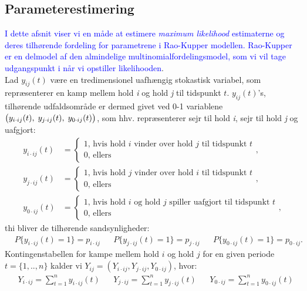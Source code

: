 \documentclass[11pt,a4paper]{article}
\begin{document}
\subsection{Parameterestimering}
\textcolor{blue}{I dette afsnit viser vi en måde at estimere \textit{maximum likelihood} estimaterne og deres tilhørende fordeling for parametrene i Rao-Kupper modellen.
Rao-Kupper er en delmodel af den almindelige multinomialfordelingsmodel, som vi vil tage udgangspunkt i når vi opstiller likelihooden}.\\
Lad $y_{ij}(t)$ være en tredimensionel uafhængig stokastisk variabel, som repræsenterer en kamp mellem hold \textit{i} og hold \textit{j} til tidspunkt $t$. $y_{ij}(t)$'s, tilhørende udfaldsområde er dermed givet ved 0-1 variablene $\big{(}y_{i\cdot ij}(t),\;y_{j\cdot ij}(t),\;y_{0\cdot ij}(t)\big{)}$, som hhv. repræsenterer sejr til hold \textit{i}, sejr til hold \textit{j} og uafgjort: 
\begin{align*}
  y_{i\cdot ij}(t)&=\begin{cases}
1\text{, hvis hold $i$ vinder over hold $j$ til tidspunkt $t$}\\
0\text{, ellers}
\end{cases},\\
 y_{j\cdot ij}(t)&=\begin{cases}
1\text{, hvis hold $j$ vinder over hold $i$ til tidspunkt $t$}\\
0\text{, ellers}
\end{cases},\\
 y_{0\cdot ij}(t)&=\begin{cases}
1\text{, hvis hold $i$ og hold $j$ spiller uafgjort til tidspunkt $t$}\\
0\text{, ellers}
\end{cases},
\end{align*}
thi bliver de tilhørende sandsynligheder:
\begin{align*}
   &P\{y_{i\cdot ij}(t)=1\}=p_{i\cdot ij} &&P\{y_{j\cdot ij}(t)=1\}=p_{j\cdot ij} &&P\{y_{0\cdot ij}(t)=1\}=p_{0\cdot ij}.
\end{align*}
 Kontingenstabellen for kampe mellem hold $i$ og hold $j$ for en given periode $t=\{1,..,n\}$ kalder vi $Y_{ij}=(Y_{i\cdot ij},Y_{j\cdot ij},Y_{0\cdot ij})$, hvor:
\begin{align*}
    &Y_{i\cdot ij}=\sum_{t=1}^{n}y_{i\cdot ij}(t) &&Y_{j\cdot ij}=\sum_{t=1}^ny_{j\cdot ij}(t) &&Y_{0\cdot ij}=\sum_{t=1}^ny_{0\cdot ij}(t)
\end{align*}
\\
\end{document}
